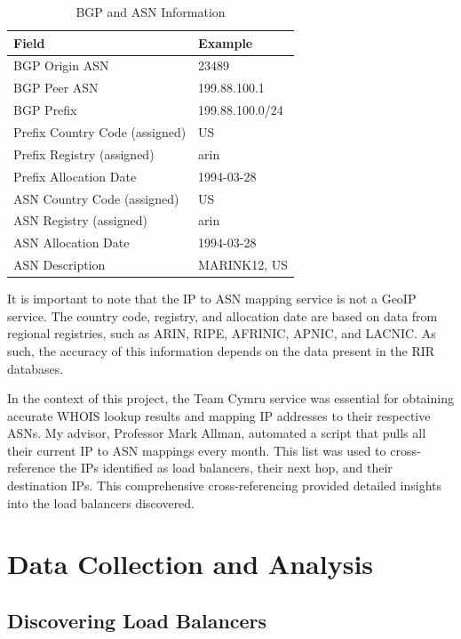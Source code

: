 \documentclass[12pt]{cwru_thesis}
\begin{document}
\begin{table}[h]
    \centering
    \begin{tabular}{|l|l|}
        \hline
        \textbf{Field} & \textbf{Example} \\
        \hline
        BGP Origin ASN & 23489 \\
        \hline
        BGP Peer ASN & 199.88.100.1 \\
        \hline
        BGP Prefix & 199.88.100.0/24 \\
        \hline
        Prefix Country Code (assigned) & US \\
        \hline
        Prefix Registry (assigned) & arin \\
        \hline
        Prefix Allocation Date & 1994-03-28 \\
        \hline
        ASN Country Code (assigned) & US \\
        \hline
        ASN Registry (assigned) & arin \\
        \hline
        ASN Allocation Date & 1994-03-28 \\
        \hline
        ASN Description & MARINK12, US \\
        \hline
    \end{tabular}
    \caption{BGP and ASN Information}
    \label{tab:bgp_asn_info}
\end{table}

It is important to note that the IP to ASN mapping service is not a GeoIP service. The country code, registry, and allocation date are based on data from regional registries, such as ARIN, RIPE, AFRINIC, APNIC, and LACNIC. As such, the accuracy of this information depends on the data present in the RIR databases.

In the context of this project, the Team Cymru service was essential for obtaining accurate WHOIS lookup results and mapping IP addresses to their respective ASNs. My advisor, Professor Mark Allman, automated a script that pulls all their current IP to ASN mappings every month. This list was used to cross-reference the IPs identified as load balancers, their next hop, and their destination IPs. This comprehensive cross-referencing provided detailed insights into the load balancers discovered. 




\chapter{Data Collection and Analysis}
\section{Discovering Load Balancers}
\end{document}
